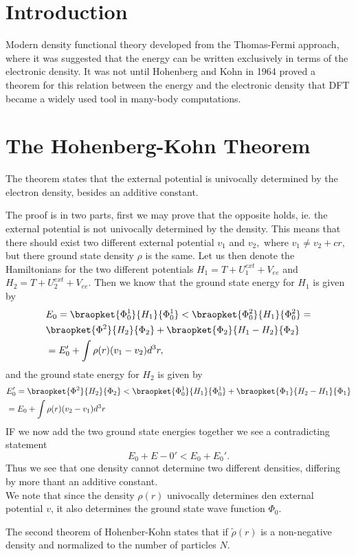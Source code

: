 \documentclass[a4paper,10pt,english]{article}%
\begin{document}
\section{Introduction}
Modern density functional theory developed from the Thomas-Fermi approach, where
it was suggested that the energy can be written exclusively in terms of the 
electronic density. It was not until Hohenberg and Kohn in 1964 proved a theorem
for this relation between the energy and the electronic density that DFT became
a widely used tool in many-body computations.

\section{The Hohenberg-Kohn Theorem}
The theorem states that the external potential is univocally determined by the 
electron density, besides an additive constant.

The proof is in two parts, first we may prove that the opposite holds, ie. the
external potential is not univocally determined by the density. This means that
there should exist two different external potential $v_1$ and $v_2,$ where
$v_1\neq v_2 +cr,$ but there ground state density $\rho$ is the same. Let us
then denote the Hamiltonians for the two different potentials $H_1=T+U^{ext}_1+V_{ee}$ and $H_2=T+U^{ext}_2+V_{ee}.$ Then we know that the ground state
energy for $H_1$ is given by 
\begin{equation*}
        \begin{split}
                &E_0=\braopket{\Phi^1_0}{H_1}{\Phi^1_{0}}<\braopket{\Phi^2_0}{H_1}{\Phi^2_0}=\\
                &\braopket{\Phi^2}{H_2}{\Phi_2}+\braopket{\Phi_2}{H_1-H_2}{\Phi_2}\\
                &=E_0'+\int\rho(r)(v_1-v_2)d^3r,
        \end{split}
\end{equation*}
 and the ground state energy for $H_2$ is given by
\begin{equation*}
        \begin{split}
                &E_0'=\braopket{\Phi^2}{H_2}{\Phi_2}<\braopket{\Phi^1_0}{H_1}{\Phi^1_{0}}+\braopket{\Phi_1}{H_2-H_1}{\Phi_1}\\
                &=E_0+\int\rho(r)(v_2-v_1)d^3r
        \end{split}
        \label{sc1eq:1}
\end{equation*}
IF we now add the two ground state energies together we see a contradicting 
statement
\begin{equation*}
       E_0+E-0'<E_0+E_0'.
        \label{sqeq:contr}
\end{equation*}
Thus we see that one density cannot determine two different densities, differing
by more thant an additive constant.\\

We note that since the density $\rho(r)$ univocally determines den external potential $v$, it also determines the ground state wave function $\Phi_0$.

The second theorem of Hohenber-Kohn states that if $\tilde \rho(r)$ is a non-negative density and normalized to the number of particles $N$.
\end{document}
